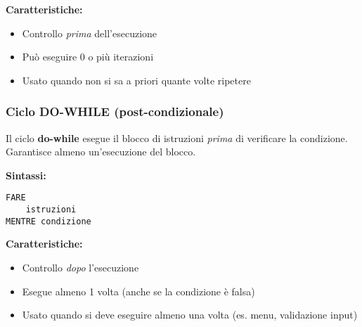\documentclass[a4paper,16pt]{article}
\begin{document}
\textbf{Caratteristiche:}
\begin{itemize}[leftmargin=*]
    \item Controllo \textit{prima} dell'esecuzione
    \item Può eseguire 0 o più iterazioni
    \item Usato quando non si sa a priori quante volte ripetere
\end{itemize}

\begin{center}
\end{center}

\newpage
\subsubsection{Ciclo DO-WHILE (post-condizionale)}

Il ciclo \textbf{do-while} esegue il blocco di istruzioni \textit{prima} di verificare la condizione. Garantisce almeno un'esecuzione del blocco.

\textbf{Sintassi:}
\begin{lstlisting}
FARE
    istruzioni
MENTRE condizione
\end{lstlisting}

\textbf{Caratteristiche:}
\begin{itemize}[leftmargin=*]
    \item Controllo \textit{dopo} l'esecuzione
    \item Esegue almeno 1 volta (anche se la condizione è falsa)
    \item Usato quando si deve eseguire almeno una volta (es. menu, validazione input)
\end{itemize}
\end{document}
